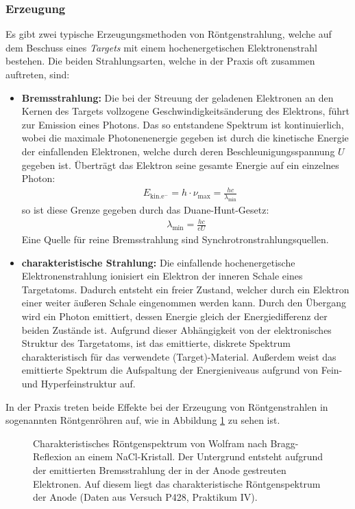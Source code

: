 \documentclass[11pt, a4paper]{article}
\numberwithin{equation}{section}
\begin{document}
\subsubsection{Erzeugung}
\label{sec:röntgenerzeugung}
Es gibt zwei typische Erzeugungsmethoden von Röntgenstrahlung, welche auf dem Beschuss eines \emph{Targets} mit einem hochenergetischen Elektronenstrahl bestehen.
Die beiden Strahlungsarten, welche in der Praxis oft zusammen auftreten, sind:
\begin{itemize}
	\item \textbf{Bremsstrahlung:} Die bei der Streuung der geladenen Elektronen an den Kernen des Targets vollzogene Geschwindigkeitsänderung des Elektrons, führt zur Emission eines Photons.
	Das so entstandene Spektrum ist kontinuierlich, wobei die maximale Photonenenergie gegeben ist durch die kinetische Energie der einfallenden Elektronen, welche durch deren Beschleunigungsspannung $U$ gegeben ist.
	Überträgt das Elektron seine gesamte Energie auf ein einzelnes Photon:
	\begin{align}
	&E_\mathrm{kin. e^-} = h \cdot \nu_\mathrm{max} = \frac{hc}{\lambda_\mathrm{min}}
	\end{align}
	so ist diese Grenze gegeben durch das Duane-Hunt-Gesetz:
	\begin{align}
	\lambda_\mathrm{min} = \frac{h c}{e U}
	\label{eq:duane_hunt}
	\end{align}
	Eine Quelle für reine Bremsstrahlung sind Synchrotronstrahlungsquellen.
	
	\item \textbf{charakteristische Strahlung:} Die einfallende hochenergetische Elektronenstrahlung ionisiert ein Elektron der inneren Schale eines Targetatoms.
	Dadurch entsteht ein freier Zustand, welcher durch ein Elektron einer weiter äußeren Schale eingenommen werden kann.
	Durch den Übergang wird ein Photon emittiert, dessen Energie gleich der Energiedifferenz der beiden Zustände ist.
	Aufgrund dieser Abhängigkeit von der elektronisches Struktur des Targetatoms, ist das emittierte, diskrete Spektrum charakteristisch für das verwendete (Target)-Material.
	Außerdem weist das emittierte Spektrum die Aufspaltung der Energieniveaus aufgrund von Fein- und Hyperfeinstruktur auf.
\end{itemize}
In der Praxis treten beide Effekte bei der Erzeugung von Röntgenstrahlen in sogenannten Röntgenröhren auf, wie in Abbildung \ref{fig:spektrum} zu sehen ist.
\begin{figure}[ht]
	\centering
	
	\caption{Charakteristisches Röntgenspektrum von Wolfram nach Bragg-Reflexion an einem NaCl-Kristall. Der Untergrund entsteht aufgrund der emittierten Bremsstrahlung der in der Anode gestreuten Elektronen. Auf diesem liegt das charakteristische Röntgenspektrum der Anode (Daten aus Versuch P428, Praktikum IV).}
	\label{fig:spektrum}
\end{figure}
\end{document}

